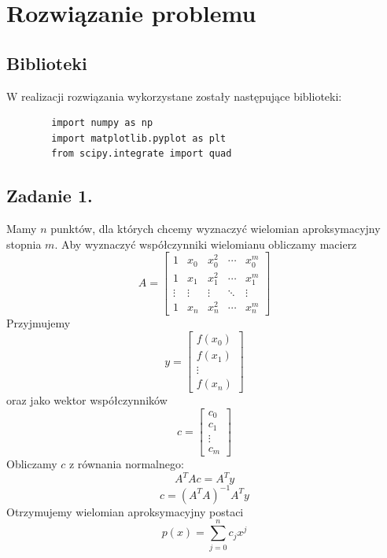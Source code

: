 \documentclass[11pt]{scrartcl}
\begin{document}
    \section{Rozwiązanie problemu}
    \subsection{Biblioteki}
    W realizacji rozwiązania wykorzystane zostały następujące
    biblioteki:
    \begin{lstlisting}
        import numpy as np
        import matplotlib.pyplot as plt
        from scipy.integrate import quad
    \end{lstlisting}

    \subsection{Zadanie 1.}
    Mamy $n$ punktów, dla których chcemy wyznaczyć wielomian
    aproksymacyjny stopnia $m$. Aby wyznaczyć współczynniki wielomianu
    obliczamy macierz
    \[
        A=
        \begin{bmatrix}
            1 & x_0 & x_0^2 & \cdots & x_0^m \\
            1 & x_1 & x_1^2 & \cdots & x_1^m \\
            \vdots & \vdots & \vdots & \ddots & \vdots \\
            1 & x_n & x_n^2 & \cdots & x_n^m
        \end{bmatrix}
    \]
    Przyjmujemy
    \[
        y=
        \begin{bmatrix}
            f(x_0) \\
            f(x_1) \\
            \vdots \\
            f(x_n)
        \end{bmatrix}
    \]
    oraz jako wektor współczynników
    \[
        c=
        \begin{bmatrix}
            c_0 \\
            c_1 \\
            \vdots \\
            c_m
        \end{bmatrix}
    \]
    Obliczamy $c$ z równania normalnego:
    \[
        A^TAc=A^Ty
    \]
    \[
        c=(A^TA)^{-1}A^Ty
    \]
    Otrzymujemy wielomian aproksymacyjny postaci
    \[
        p(x)=\sum_{j=0}^{n}c_jx^j
    \]
\end{document}
